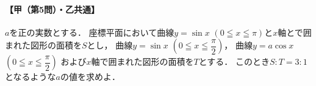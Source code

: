 \documentclass[../../main.tex]{subfiles}
\begin{document}
\paragraph{【甲（第5問）・乙共通】}
$a$を正の実数とする．
座標平面において曲線$y=\sin x$ $(0 \leqq x \leqq \pi)$と$x$軸とで囲まれた図形の面積を$S$とし，
曲線$y=\sin x$ $\displaystyle \left( 0 \leqq x \leqq \dfrac{\pi}{2} \right)$，
曲線$y=a\cos x$ $\displaystyle \left( 0 \leqq x \leqq \dfrac{\pi}{2} \right)$
および$x$軸で囲まれた図形の面積を$T$とする．
このとき$S:T=3:1$となるような$a$の値を求めよ．
\end{document}
